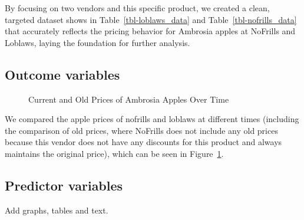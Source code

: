 \documentclass[
  letterpaper,
  DIV=11,
  numbers=noendperiod]{scrartcl}
\begin{document}
By focusing on two vendors and this specific product, we created a
clean, targeted dataset shows in Table~\ref{tbl-loblaws_data} and
Table~\ref{tbl-nofrills_data} that accurately reflects the pricing
behavior for Ambrosia apples at NoFrills and Loblaws, laying the
foundation for further analysis.

\subsection{Outcome variables}\label{outcome-variables}

\begin{figure}


\caption{\label{fig-compare_price_vendor}Current and Old Prices of
Ambrosia Apples Over Time}

\end{figure}%

We compared the apple prices of nofrills and loblaws at different times
(including the comparison of old prices, where NoFrills does not include
any old prices because this vendor does not have any discounts for this
product and always maintains the original price), which can be seen in
Figure~\ref{fig-compare_price_vendor}.

\subsection{Predictor variables}\label{predictor-variables}

Add graphs, tables and text.
\end{document}
